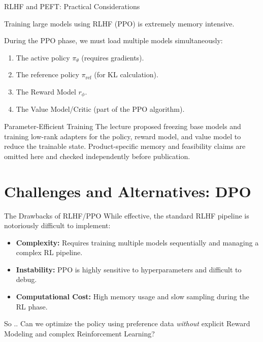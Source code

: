 \documentclass[xcolor=svgnames, 10pt, handout]{beamer}
\begin{document}
\begin{frame}{RLHF and PEFT: Practical Considerations}
    \begin{block}{
        Training large models using RLHF (PPO) is extremely memory intensive.}

    \pause
    During the PPO phase, we must load multiple models simultaneously:
    \begin{enumerate}
        \item The active policy $\pi_\theta$ (requires gradients).
        \pause
        \item The reference policy $\pi_{\text{ref}}$ (for KL calculation).
        \pause
        \item The Reward Model $r_\phi$.
        \pause
        \item The Value Model/Critic (part of the PPO algorithm).
    \end{enumerate}
    \end{block}
    \pause
    \begin{alertblock}{Parameter-Efficient Training}
        The lecture proposed freezing base models and training low-rank adapters for
        the policy, reward model, and value model to reduce the trainable state.
        Product-specific memory and feasibility claims are omitted here and checked
        independently before publication.
    \end{alertblock}
\end{frame}

\section{Challenges and Alternatives: DPO}

\begin{frame}{The Drawbacks of RLHF/PPO}
    While effective, the standard RLHF pipeline is notoriously difficult to implement:
    \pause

    \begin{itemize}
        \item \textbf{Complexity:} Requires training multiple models sequentially and managing a complex RL pipeline.
        \pause
        \item \textbf{Instability:} PPO is highly sensitive to hyperparameters and difficult to debug.
        \pause
        \item \textbf{Computational Cost:} High memory usage and slow sampling during the RL phase.
    \end{itemize}

    \vspace{0.5cm}
    \pause
    \begin{block}{So ..}
        Can we optimize the policy using preference data \textit{without} explicit Reward Modeling and complex Reinforcement Learning?
    \end{block}
\end{frame}
\end{document}
